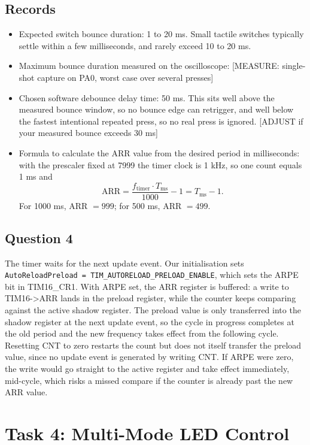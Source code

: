 \documentclass[11pt]{article}
\begin{document}
\subsection{Records}
\begin{itemize}
    \item Expected switch bounce duration: 1 to 20 ms. Small tactile switches typically settle within a few milliseconds, and rarely exceed 10 to 20 ms.
    \item Maximum bounce duration measured on the oscilloscope: [MEASURE: single-shot capture on PA0, worst case over several presses]
    \item Chosen software debounce delay time: 50 ms. This sits well above the measured bounce window, so no bounce edge can retrigger, and well below the fastest intentional repeated press, so no real press is ignored. [ADJUST if your measured bounce exceeds 30 ms]
    \item Formula to calculate the ARR value from the desired period in milliseconds: with the prescaler fixed at 7999 the timer clock is 1 kHz, so one count equals 1 ms and
    \[
        \text{ARR} = \frac{f_{\text{timer}} \cdot T_{\text{ms}}}{1000} - 1 = T_{\text{ms}} - 1.
    \]
    For 1000 ms, ARR $= 999$; for 500 ms, ARR $= 499$.
\end{itemize}

\subsection{Question 4}
The timer waits for the next update event. Our initialisation sets \texttt{AutoReloadPreload = TIM\_AUTORELOAD\_PRELOAD\_ENABLE}, which sets the ARPE bit in TIM16\_CR1. With ARPE set, the ARR register is buffered: a write to TIM16->ARR lands in the preload register, while the counter keeps comparing against the active shadow register. The preload value is only transferred into the shadow register at the next update event, so the cycle in progress completes at the old period and the new frequency takes effect from the following cycle. Resetting CNT to zero restarts the count but does not itself transfer the preload value, since no update event is generated by writing CNT. If ARPE were zero, the write would go straight to the active register and take effect immediately, mid-cycle, which risks a missed compare if the counter is already past the new ARR value.

\section{Task 4: Multi-Mode LED Control}
\end{document}
